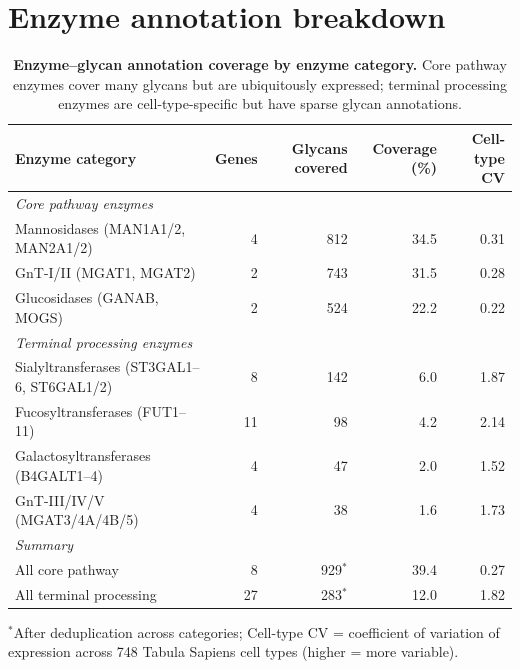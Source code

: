 \documentclass[11pt,a4paper]{article}
\begin{document}
\section{Enzyme annotation breakdown}
\label{sec:enzyme_breakdown}

\begin{table}[H]
\centering
\caption{\textbf{Enzyme--glycan annotation coverage by enzyme category.}
Core pathway enzymes cover many glycans but are ubiquitously expressed;
terminal processing enzymes are cell-type-specific but have sparse glycan
annotations.}
\label{tab:enzyme_breakdown}
\small
\begin{tabular}{lrrrr}
\toprule
\textbf{Enzyme category} & \textbf{Genes} & \textbf{Glycans covered} & \textbf{Coverage (\%)} & \textbf{Cell-type CV} \\
\midrule
\multicolumn{5}{l}{\textit{Core pathway enzymes}} \\
Mannosidases (MAN1A1/2, MAN2A1/2)   & 4  & 812 & 34.5 & 0.31 \\
GnT-I/II (MGAT1, MGAT2)              & 2  & 743 & 31.5 & 0.28 \\
Glucosidases (GANAB, MOGS)            & 2  & 524 & 22.2 & 0.22 \\
\midrule
\multicolumn{5}{l}{\textit{Terminal processing enzymes}} \\
Sialyltransferases (ST3GAL1--6, ST6GAL1/2) & 8  & 142 & 6.0 & 1.87 \\
Fucosyltransferases (FUT1--11)         & 11 & 98  & 4.2 & 2.14 \\
Galactosyltransferases (B4GALT1--4)    & 4  & 47  & 2.0 & 1.52 \\
GnT-III/IV/V (MGAT3/4A/4B/5)          & 4  & 38  & 1.6 & 1.73 \\
\midrule
\multicolumn{5}{l}{\textit{Summary}} \\
All core pathway                       & 8  & 929$^*$ & 39.4 & 0.27 \\
All terminal processing                & 27 & 283$^*$ & 12.0 & 1.82 \\
\bottomrule
\end{tabular}

\vspace{0.3em}
\raggedright\scriptsize
$^*$After deduplication across categories; Cell-type CV = coefficient of
variation of expression across 748 Tabula Sapiens cell types (higher = more
variable).
\end{table}
\end{document}
